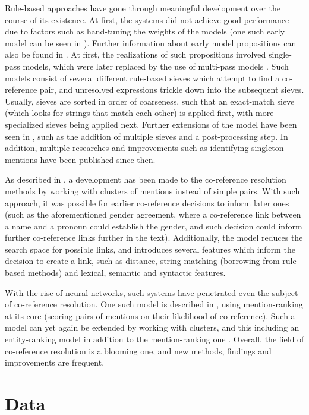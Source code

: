 \documentclass[a4paper, 11pt]{article}
\begin{document}
Rule-based approaches have gone through meaningful development over the course of its existence. At first, the systems did not achieve good performance due to factors such as hand-tuning the weights of the models (one such early model can be seen in \citet{lappin}). Further information about early model propositions can also be found in \citet{baldwin}. At first, the realizations of such propositions involved single-pass models, which were later replaced by the use of multi-pass models \citep{raghunathan2010}. Such models consist of several different rule-based sieves which attempt to find a co-reference pair, and unresolved expressions trickle down into the subsequent sieves. Usually, sieves are sorted in order of coarseness, such that an exact-match sieve (which looks for strings that match each other) is applied first, with more specialized sieves being applied next. Further extensions of the model have been seen in \citet{lee11conllst}, such as the addition of multiple sieves and a post-processing step. In addition, multiple researches and improvements such as identifying singleton mentions \citep{recasens_demarneffe_potts2013} have been published since then.

As described in \citet{clark2015entity}, a development has been made to the co-reference resolution methods by working with clusters of mentions instead of simple pairs. With such approach, it was possible for earlier co-reference decisions to inform later ones (such as the aforementioned gender agreement, where a co-reference link between a name and a pronoun could establish the gender, and such decision could inform further co-reference links further in the text). Additionally, the model reduces the search space for possible links, and introduces several features which inform the decision to create a link, such as distance, string matching (borrowing from rule-based methods) and lexical, semantic and syntactic features.

With the rise of neural networks, such systems have penetrated even the subject of co-reference resolution. One such model is described in \citet{clark2016deep}, using mention-ranking at its core (scoring pairs of mentions on their likelihood of co-reference). Such a model can yet again be extended by working with clusters, and this including an entity-ranking model in addition to the mention-ranking one \citep{clark2016impr}. Overall, the field of co-reference resolution is a blooming one, and new methods, findings and improvements are frequent.

\section{Data}
\end{document}
